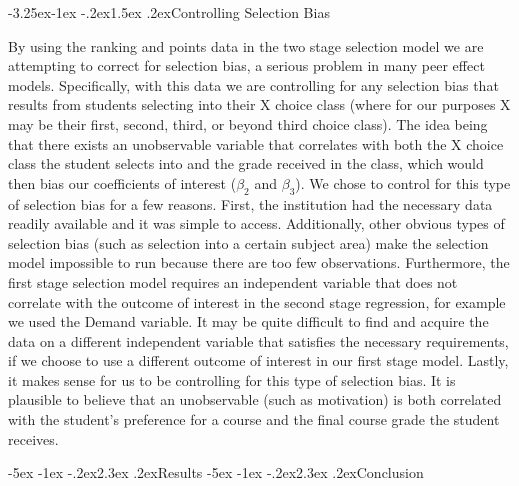 \documentclass[12pt,a4paper,english,fleqn]{article}
\makeatletter
\renewcommand\section{\@startsection{section}{1}{\z@}
{-5ex \@plus -1ex \@minus -.2ex}{2.3ex \@plus.2ex}{\normalfont\large\bf}}
\renewcommand\subsection{\@startsection{subsection}{2}
{\z@}{-3.25ex\@plus -1ex \@minus -.2ex}{1.5ex \@plus .2ex}{\normalfont\bf}}
\makeatother
\begin{document}
\subsection{Controlling Selection Bias}

By using the ranking and points data in the two stage selection model we are attempting to correct for selection bias, a serious problem in many peer effect models. 
Specifically, with this data we are controlling for any selection bias that results from students selecting into their X choice class (where for our purposes X may be their first, second, third, or beyond third choice class). 
The idea being that there exists an unobservable variable that correlates with both the X choice class the student selects into and the grade received in the class, which would then bias our coefficients of interest ($\beta_{2}$ and $\beta_{3}$). 
We chose to control for this type of selection bias for a few reasons. 
First, the institution had the necessary data readily available and it was simple to access. 
Additionally, other obvious types of selection bias (such as selection into a certain subject area) make the selection model impossible to run because there are too few observations. 
Furthermore, the first stage selection model requires an independent variable that does not correlate with the outcome of interest in the second stage regression, for example we used the Demand variable. 
It may be quite difficult to find and acquire the data on a different independent variable that satisfies the necessary requirements, if we choose to use a different outcome of interest in our first stage model. 
Lastly, it makes sense for us to be controlling for this type of selection bias. 
It is plausible to believe that an unobservable (such as motivation) is both correlated with the student's preference for a course and the final course grade the student receives. 

\section{Results}\label{results}
\section{Conclusion}\label{Conclusion}
             
\newpage{}

\singlespacing


\end{document}
